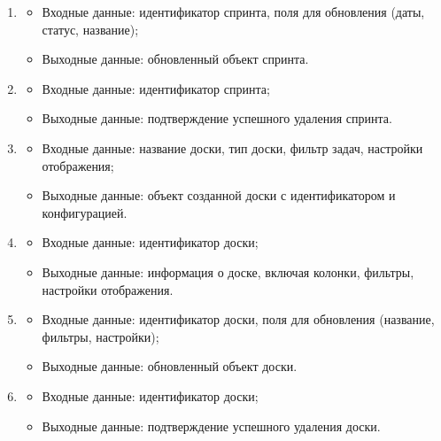 \documentclass[utf8, russian]{eskdtext}
\begin{document}
\begin{enumerate}
    \item {}
    \begin{itemize}
        \item Входные данные: идентификатор спринта, поля для обновления (даты, статус, название);
        \item Выходные данные: обновленный объект спринта.
    \end{itemize}
    
    \item {}
    \begin{itemize}
        \item Входные данные: идентификатор спринта;
        \item Выходные данные: подтверждение успешного удаления спринта.
    \end{itemize}
    
    \item {}
    \begin{itemize}
        \item Входные данные: название доски, тип доски, фильтр задач, настройки отображения;
        \item Выходные данные: объект созданной доски с идентификатором и конфигурацией.
    \end{itemize}
    
    \item {}
    \begin{itemize}
        \item Входные данные: идентификатор доски;
        \item Выходные данные: информация о доске, включая колонки, фильтры, настройки отображения.
    \end{itemize}
    
    \item {}
    \begin{itemize}
        \item Входные данные: идентификатор доски, поля для обновления (название, фильтры, настройки);
        \item Выходные данные: обновленный объект доски.
    \end{itemize}
    
    \item {}
    \begin{itemize}
        \item Входные данные: идентификатор доски;
        \item Выходные данные: подтверждение успешного удаления доски.
    \end{itemize}
    

\end{enumerate}
\end{document}
